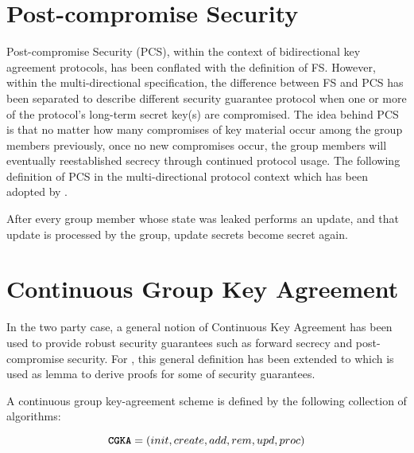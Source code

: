 \hypertarget{post-compromise-security}{%
\section{Post-compromise Security}\label{post-compromise-security}}

Post-compromise Security (PCS), within the context of bidirectional key agreement protocols, has been conflated with the definition of FS.
However, within the multi-directional  specification, the difference between FS and PCS has been separated to describe different security guarantee protocol when one or more of the protocol's long-term secret key(s) are compromised.
The idea behind PCS is that no matter how many compromises of key material occur among the group members previously, once no new compromises occur, the group members will eventually reestablished secrecy through continued protocol usage.
The following definition of PCS in the multi-directional protocol context \autocite{alwen2020security} which has been adopted by .

\begin{definition}
After every group member whose state was leaked performs an update, and that update is processed by the group, update secrets become secret again.
\end{definition}


\hypertarget{sec:CGKA}{%
\section{Continuous Group Key Agreement}\label{sec:CGKA}}

In the two party case, a general notion of Continuous Key Agreement \autocite{alwen2019double} has been used to provide robust security guarantees such as forward secrecy and post-compromise security.
For , this general definition has been extended to  \autocite{alwen2020security} which is used as lemma to derive proofs for some of  security guarantees.

A continuous group key-agreement scheme is defined by the following collection of algorithms:

\[ \textbf{\texttt{CGKA}} = (init, create, add, rem, upd, proc)\]

